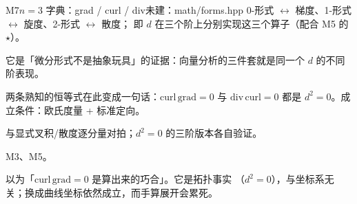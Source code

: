 \begin{know}{M7}{$n=3$ 字典：grad / curl / div}{未建：math/forms.hpp}
 0-形式 $\leftrightarrow$ 梯度、1-形式 $\leftrightarrow$ 旋度、2-形式 $\leftrightarrow$ 散度；
即 $d$ 在三个阶上分别实现这三个算子（配合 M5 的 $\star$）。

 它是「微分形式不是抽象玩具」的证据：向量分析的三件套就是同一个 $d$ 的不同阶表现。

 两条熟知的恒等式在此变成一句话：$\mathrm{curl}\,\mathrm{grad}=0$ 与
$\mathrm{div}\,\mathrm{curl}=0$ 都是 $d^{2}=0$。成立条件：欧氏度量 + 标准定向。

 与显式叉积/散度逐分量对拍；$d^{2}=0$ 的三阶版本各自验证。

 M3、M5。

 以为「$\mathrm{curl}\,\mathrm{grad}=0$ 是算出来的巧合」。它是拓扑事实
（$d^{2}=0$），与坐标系无关；换成曲线坐标依然成立，而手算展开会累死。
\end{know}
